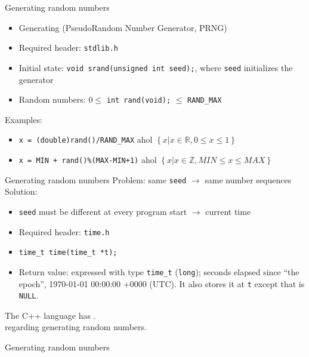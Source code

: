 \documentclass[usenames,dvipsnames,aspectratio=169]{beamer}
\begin{document}
\begin{frame}{Generating random numbers}
  \begin{itemize}
    \item Generating  (PseudoRandom Number Generator, PRNG)
    \item Required header: \texttt{stdlib.h}
    \item Initial state: \texttt{void srand(unsigned int seed);}, where \texttt{seed} initializes the generator
    \item Random numbers: $0 \leq$ \texttt{int rand(void);} $\leq$ \texttt{RAND\_MAX}
  \end{itemize}
  Examples:
   \begin{itemize}
     \item \texttt{x = (double)rand()/RAND\_MAX} ahol $\left\{x|x\in\mathbb{R}, 0 \leq x \leq 1 \right\}$
     \item \texttt{x = MIN + rand()\%(MAX-MIN+1)} ahol $\left\{x|x\in\mathbb{Z}, MIN \leq x \leq MAX \right\}$
   \end{itemize}
\end{frame}

\begin{frame}{Generating random numbers}
  Problem: same \texttt{seed} $\to$ same number sequences\\
  Solution:
  \begin{itemize}
    \item \texttt{seed} must be different at every program start $\to$ current time
    \item Required header: \texttt{time.h}
    \item \texttt{time\_t time(time\_t *t);}
    \item Return value: expressed with type \texttt{time\_t} (\texttt{long}); seconds elapsed since ``the epoch'', 1970-01-01 00:00:00 +0000 (UTC). It also stores it at \texttt{t} except that is \texttt{NULL}.
  \end{itemize}
  \vfill
  \tiny
  The C++ language has .\\
   regarding generating random numbers.
\end{frame}

\begin{frame}{Generating random numbers}
  \begin{exampleblock}{}
    \scriptsize
    
  \end{exampleblock}
\end{frame}
\end{document}
